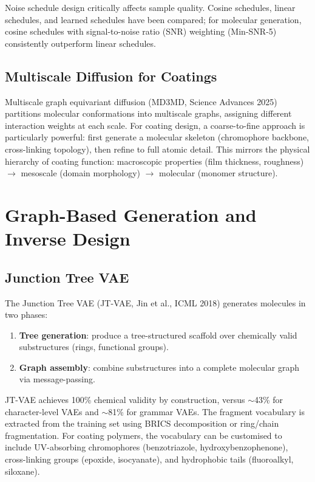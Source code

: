 \documentclass[11pt,a4paper]{article}
\begin{document}
Noise schedule design critically affects sample quality.
Cosine schedules, linear schedules, and learned schedules have been compared; for molecular generation, cosine schedules with signal-to-noise ratio (SNR) weighting (Min-SNR-5) consistently outperform linear schedules.

\subsection{Multiscale Diffusion for Coatings}

Multiscale graph equivariant diffusion (MD3MD, Science Advances 2025) partitions molecular conformations into multiscale graphs, assigning different interaction weights at each scale.
For coating design, a coarse-to-fine approach is particularly powerful: first generate a molecular skeleton (chromophore backbone, cross-linking topology), then refine to full atomic detail.
This mirrors the physical hierarchy of coating function: macroscopic properties (film thickness, roughness) $\to$ mesoscale (domain morphology) $\to$ molecular (monomer structure).

\section{Graph-Based Generation and Inverse Design}
\label{sec:graphgen}

\subsection{Junction Tree VAE}

The Junction Tree VAE (JT-VAE, Jin et al., ICML 2018) generates molecules in two phases:
\begin{enumerate}[nosep]
  \item \textbf{Tree generation}: produce a tree-structured scaffold over chemically valid substructures (rings, functional groups).
  \item \textbf{Graph assembly}: combine substructures into a complete molecular graph via message-passing.
\end{enumerate}
JT-VAE achieves 100\% chemical validity by construction, versus $\sim$43\% for character-level VAEs and $\sim$81\% for grammar VAEs.
The fragment vocabulary is extracted from the training set using BRICS decomposition or ring/chain fragmentation.
For coating polymers, the vocabulary can be customised to include UV-absorbing chromophores (benzotriazole, hydroxybenzophenone), cross-linking groups (epoxide, isocyanate), and hydrophobic tails (fluoroalkyl, siloxane).
\end{document}
